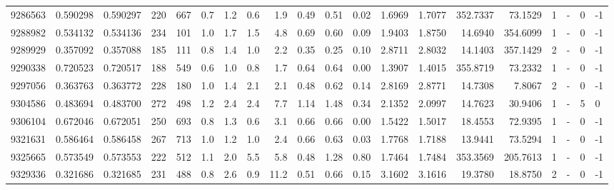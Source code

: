 \begin{tabular}{rrrrrrrrrrrrrrrrrlrl}
   9286563 & 0.590298 &   0.590297 &  220 &  667 &      0.7 &      1.2 &     0.6 &      1.9 &       0.49 &        0.51 &        0.02 &  1.6969 &  1.7077 &  352.7337 &   73.1529 &       1 &             - &        0 &        -1 \\
   9288982 & 0.534132 &   0.534136 &  234 &  101 &      1.0 &      1.7 &     1.5 &      4.8 &       0.69 &        0.60 &        0.09 &  1.9403 &  1.8750 &   14.6940 &  354.6099 &       1 &             - &        0 &        -1 \\
   9289929 & 0.357092 &   0.357088 &  185 &  111 &      0.8 &      1.4 &     1.0 &      2.2 &       0.35 &        0.25 &        0.10 &  2.8711 &  2.8032 &   14.1403 &  357.1429 &       2 &             - &        0 &        -1 \\
   9290338 & 0.720523 &   0.720517 &  188 &  549 &      0.6 &      1.0 &     0.8 &      1.7 &       0.64 &        0.64 &        0.00 &  1.3907 &  1.4015 &  355.8719 &   73.2332 &       1 &             - &        0 &        -1 \\
   9297056 & 0.363763 &   0.363772 &  228 &  180 &      1.0 &      1.4 &     2.1 &      2.1 &       0.48 &        0.62 &        0.14 &  2.8169 &  2.8771 &   14.7308 &    7.8067 &       2 &             - &        0 &        -1 \\
   9304586 & 0.483694 &   0.483700 &  272 &  498 &      1.2 &      2.4 &     2.4 &      7.7 &       1.14 &        1.48 &        0.34 &  2.1352 &  2.0997 &   14.7623 &   30.9406 &       1 &             - &        5 &         0 \\
   9306104 & 0.672046 &   0.672051 &  250 &  693 &      0.8 &      1.3 &     0.6 &      3.1 &       0.66 &        0.66 &        0.00 &  1.5422 &  1.5017 &   18.4553 &   72.9395 &       1 &             - &        0 &        -1 \\
   9321631 & 0.586464 &   0.586458 &  267 &  713 &      1.0 &      1.2 &     1.0 &      2.4 &       0.66 &        0.63 &        0.03 &  1.7768 &  1.7188 &   13.9441 &   73.5294 &       1 &             - &        0 &        -1 \\
   9325665 & 0.573549 &   0.573553 &  222 &  512 &      1.1 &      2.0 &     5.5 &      5.8 &       0.48 &        1.28 &        0.80 &  1.7464 &  1.7484 &  353.3569 &  205.7613 &       1 &             - &        0 &        -1 \\
   9329336 & 0.321686 &   0.321685 &  231 &  488 &      0.8 &      2.6 &     0.9 &     11.2 &       0.51 &        0.66 &        0.15 &  3.1602 &  3.1616 &   19.3780 &   18.8750 &       2 &             - &        0 &        -1 \\

\end{tabular}
